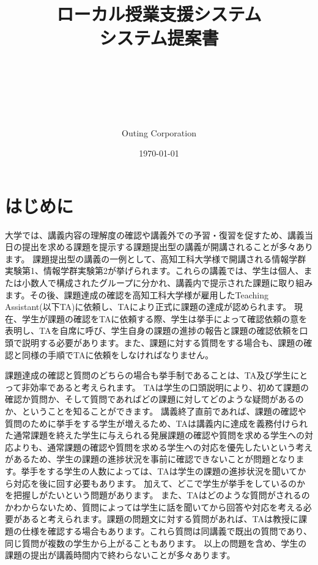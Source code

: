 \documentclass[a4j,titlepage]{ujarticle}
\title{
{ローカル授業支援システム
\\
システム提案書}
\author{\\
\\
\\
\\
\\
Outing Corporation}
\date{\today}
}
\begin{document}
\maketitle


\tableofcontents

\clearpage

\section{はじめに}

大学では、講義内容の理解度の確認や講義外での予習・復習を促すため、講義当日の提出を求める課題を提示する課題提出型の講義が開講されることが多々あります。
課題提出型の講義の一例として、高知工科大学様で開講される情報学群実験第1、情報学群実験第2が挙げられます。これらの講義では、学生は個人、または小数人で構成されたグループに分かれ、講義内で提示された課題に取り組みます。その後、課題達成の確認を高知工科大学様が雇用したTeaching Assistant(以下TA)に依頼し、TAにより正式に課題の達成が認められます。
現在、学生が課題の確認をTAに依頼する際、学生は挙手によって確認依頼の意を表明し、TAを自席に呼び、学生自身の課題の進捗の報告と課題の確認依頼を口頭で説明する必要があります。また、課題に対する質問をする場合も、課題の確認と同様の手順でTAに依頼をしなければなりません。

課題達成の確認と質問のどちらの場合も挙手制であることは、TA及び学生にとって非効率であると考えられます。
TAは学生の口頭説明により、初めて課題の確認か質問か、そして質問であればどの課題に対してどのような疑問があるのか、ということを知ることができます。
講義終了直前であれば、課題の確認や質問のために挙手をする学生が増えるため、TAは講義内に達成を義務付けられた通常課題を終えた学生に与えられる発展課題の確認や質問を求める学生への対応よりも、通常課題の確認や質問を求める学生への対応を優先したいという考えがあるため、学生の課題の進捗状況を事前に確認できないことが問題となります。挙手をする学生の人数によっては、TAは学生の課題の進捗状況を聞いてから対応を後に回す必要もあります。
加えて、どこで学生が挙手をしているのかを把握しがたいという問題があります。
また、TAはどのような質問がされるのかわからないため、質問によっては学生に話を聞いてから回答や対応を考える必要があると考えられます。課題の問題文に対する質問があれば、TAは教授に課題の仕様を確認する場合もあります。これら質問は同講義で既出の質問であり、同じ質問が複数の学生から上がることもあります。
以上の問題を含め、学生の課題の提出が講義時間内で終わらないことが多々あります。
\end{document}
